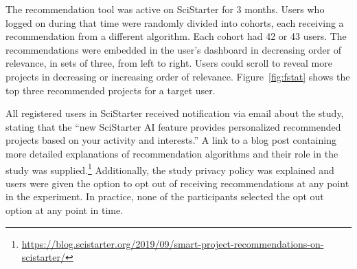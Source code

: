 \documentclass[letterpaper]{article} %
\begin{document}
The recommendation tool  was active on SciStarter  for 3 months. Users who logged on during that time were randomly divided into cohorts, each receiving a recommendation
from a different algorithm. Each cohort had 42 or 43 users.
 The recommendations were embedded in the user's
dashboard in decreasing order of relevance, in sets of three,  from left to right. Users could scroll
to reveal more projects in decreasing or increasing order of relevance. Figure~\ref{fig:fstat} shows the   top three recommended projects for a target user.


All registered users  in SciStarter received notification via email about the study, stating that the  ``new SciStarter AI feature provides personalized recommended projects based on your activity and interests.'' A link to a blog post containing more
detailed explanations of recommendation algorithms and their role in the study was supplied.\footnote{\url{https://blog.scistarter.org/2019/09/smart-project-recommendations-on-scistarter/}} Additionally, the study privacy policy was explained and users were given the option to opt out of
receiving recommendations at any point in the experiment.  In practice, none of the participants selected the opt out option at any point in time.


\end{document}

